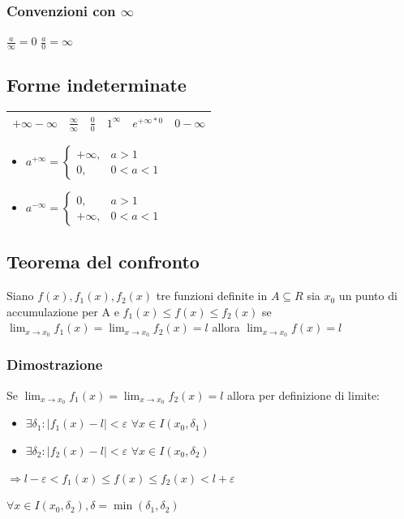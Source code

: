 \subsubsection{Convenzioni con $\infty$}
$\frac{a}{\infty}=0$ $\frac{a}{0}=\infty$

\subsection{Forme indeterminate}
\begin{tabular}{|llllll|}
	\hline
	$+\infty-\infty$&$\frac{\infty}{\infty}$&$\frac{0}{0}$&$1^\infty$&$e^{+\infty*0}$&$0-\infty$\\
	\hline
\end{tabular}
\begin{itemize}
	\item $a^{+\infty}=\begin{cases}
			+\infty,&a>1\\
			0,&0<a<1
	\end{cases}$
	\item $a^{-\infty}=\begin{cases}
			0,&a>1\\
			+\infty,&0<a<1
	\end{cases}$
\end{itemize}
\subsection{Teorema del confronto}
Siano $f(x),f_1(x),f_2(x)$ tre funzioni definite in $A\subseteq R$ sia $x_0$ un
punto di accumulazione per A e $f_1(x)\leq f(x) \leq f_2(x)$ se $\lim_{x\to
x_0}f_1(x)=\lim_{x\to x_0} f_2(x)=l$ allora $\lim_{x\to x_0} f(x)=l$
\subsubsection{Dimostrazione}
Se $\lim_{x\to x_0} f_1(x)=\lim_{x\to x_0} f_2(x)=l$ allora per definizione di
limite:
\begin{itemize}
	\item $\exists \delta_1:|f_1(x)-l|<\varepsilon$ $\forall x \in I(x_0,\delta_1)$
	\item $\exists \delta_2:|f_2(x)-l|<\varepsilon$ $\forall x \in
		I(x_0,\delta_2)$
\end{itemize}
\begin{center}
	$\Rightarrow l-\varepsilon < f_1(x) \leq f(x)\leq f_2(x) < l+ \varepsilon$
\end{center}
$\forall x \in I(x_0,\delta_2), \delta = \min (\delta_1,\delta_2)$
